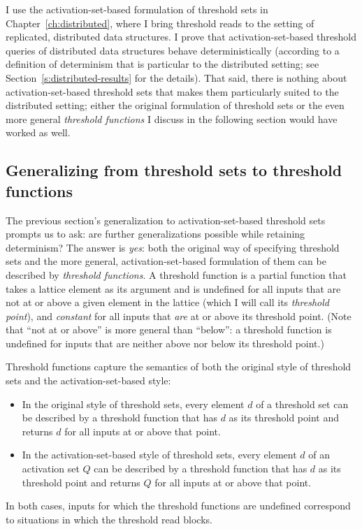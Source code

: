 \ifdefined\DISSERTATION
I use the activation-set-based formulation of threshold sets in
Chapter~\ref{ch:distributed}, where I bring threshold reads to the
setting of replicated, distributed data structures.  I prove that
activation-set-based threshold queries of distributed data structures
behave deterministically (according to a definition of determinism
that is particular to the distributed setting; see
Section~\ref{s:distributed-results} for the details).  That said,
there is nothing about activation-set-based threshold sets that makes
them particularly suited to the distributed setting; either the
original formulation of threshold sets or the even more general
\emph{threshold functions} I discuss in the following section would
have worked as well.
\fi

\subsection{Generalizing from threshold sets to threshold functions}\label{subsection:lvars-generalizing-from-threshold-sets-to-threshold-functions}

The previous section's generalization to activation-set-based
threshold sets prompts us to ask: are further generalizations possible
while retaining determinism?  The answer is \emph{yes}: both the
original way of specifying threshold sets and the more general,
activation-set-based formulation of them can be described by
\emph{threshold functions}.  A threshold function is a partial
function that takes a lattice element as its argument and is undefined
for all inputs that are not at or above a given element in the lattice
(which I will call its \emph{threshold point}), and \emph{constant}
for all inputs that \emph{are} at or above its threshold point.  (Note
that ``not at or above'' is more general than ``below'': a threshold
function is undefined for inputs that are neither above nor below its
threshold point.)

Threshold functions capture the semantics of both the original
style of threshold sets and the activation-set-based style:
\begin{itemize}
\item In the original style of threshold sets, every element $d$ of a
  threshold set can be described by a threshold function that has $d$
  as its threshold point and returns $d$ for all inputs at or above
  that point.
\item In the activation-set-based style of threshold sets, every
  element $d$ of an activation set $Q$ can be described by a threshold
  function that has $d$ as its threshold point and returns $Q$ for all
  inputs at or above that point.
\end{itemize}
In both cases, inputs for which the threshold functions are undefined
correspond to situations in which the threshold read blocks.

